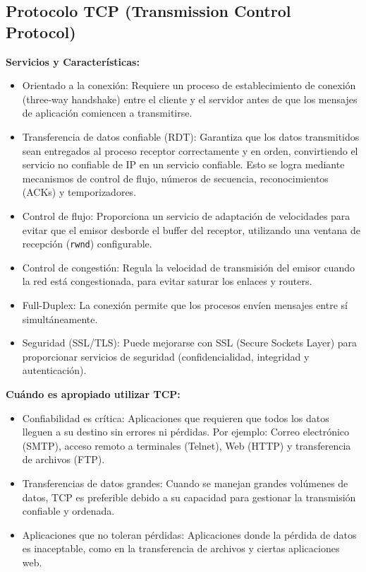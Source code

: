 \begin{enumerate}
    \subsection*{Protocolo TCP (Transmission Control Protocol)}
    
    \textbf{Servicios y Características:}
    \begin{itemize}
        \item Orientado a la conexión: Requiere un proceso de establecimiento de conexión (three-way handshake) entre el cliente y el servidor antes de que los mensajes de aplicación comiencen a transmitirse.
        \item Transferencia de datos confiable (RDT): Garantiza que los datos transmitidos sean entregados al proceso receptor correctamente y en orden, convirtiendo el servicio no confiable de IP en un servicio confiable. Esto se logra mediante mecanismos de control de flujo, números de secuencia, reconocimientos (ACKs) y temporizadores.
        \item Control de flujo: Proporciona un servicio de adaptación de velocidades para evitar que el emisor desborde el buffer del receptor, utilizando una ventana de recepción (\texttt{rwnd}) configurable.
        \item Control de congestión: Regula la velocidad de transmisión del emisor cuando la red está congestionada, para evitar saturar los enlaces y routers.
        \item Full-Duplex: La conexión permite que los procesos envíen mensajes entre sí simultáneamente.
        \item Seguridad (SSL/TLS): Puede mejorarse con SSL (Secure Sockets Layer) para proporcionar servicios de seguridad (confidencialidad, integridad y autenticación).
    \end{itemize}
    
    \textbf{Cuándo es apropiado utilizar TCP:}
    \begin{itemize}
        \item Confiabilidad es crítica: Aplicaciones que requieren que todos los datos lleguen a su destino sin errores ni pérdidas. Por ejemplo: Correo electrónico (SMTP), acceso remoto a terminales (Telnet), Web (HTTP) y transferencia de archivos (FTP).
        \item Transferencias de datos grandes: Cuando se manejan grandes volúmenes de datos, TCP es preferible debido a su capacidad para gestionar la transmisión confiable y ordenada.
        \item Aplicaciones que no toleran pérdidas: Aplicaciones donde la pérdida de datos es inaceptable, como en la transferencia de archivos y ciertas aplicaciones web.
    \end{itemize}
\end{enumerate}
